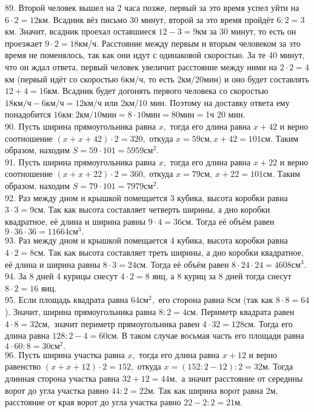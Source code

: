 89. Второй человек вышел на 2 часа позже, первый за это время успел уйти на $6\cdot2=12$км. Всадник вёз письмо 30 минут, второй за это время пройдёт $6:2=3$км. Значит, всадник проехал оставшиеся $12-3=9$км за 30 минут, то есть он проезжает $9\cdot2=18$км/ч. Расстояние между первым и вторым человеком за это время не поменялось, так как они идут с одинаковой скоростью. За те 40 минут, что он ждал ответа, первый человек увеличит расстояние между ними на $2\cdot2=4$км (первый идёт со скоростью 6км/ч, то есть 2км/20мин) и оно будет составлять $12+4=16$км. Всадник будет догонять первого человека со скоростью $18\text{км/ч}-6\text{км/ч}=12\text{км/ч}$ или 2км/10 мин. Поэтому на доставку ответа ему понадобится $16\text{км}:2\text{км/10мин}=8\cdot10\text{мин}=80\text{мин}=$1ч 20 мин.\\
90. Пусть ширина прямоугольника равна $x,$ тогда его длина равна $x+42$ и верно соотношение $(x+x+42)\cdot2=320,$ откуда $x=59\text{см}, x+42=101\text{см}.$ Таким образом, находим
$S=59\cdot101=5959\text{см}^2.$\\
91. Пусть ширина прямоугольника равна $x,$ тогда его длина равна $x+22$ и верно соотношение $(x+x+22)\cdot2=360,$ откуда $x=79\text{см},\ x+22=101\text{см}.$ Таким образом, находим
$S=79\cdot101=7979\text{см}^2.$\\
92. Раз между дном и крышкой помещается 3 кубика, высота коробки равна $3\cdot3=9$см. Так как высота составляет четверть ширины, а дно коробки квадратное, её длина и ширина равны $9\cdot4=36$см. Тогда её объём равен $9\cdot36\cdot36=11664\text{см}^3.$\\
93. Раз между дном и крышкой помещается 4 кубика, высота коробки равна $4\cdot2=8$см. Так как высота составляет треть ширины, а дно коробки квадратное, её длина и ширина равны $8\cdot3=24$см. Тогда её объём равен $8\cdot24\cdot24=4608\text{см}^3.$\\
94. За 8 дней 4 курицы снесут $4\cdot2=8$ яиц, а 8 куриц за 8 дней тогда снесут $8\cdot2=16$ яиц.\\
95. Если площадь квадрата равна $64\text{см}^2,$ его сторона равна $8\text{см}$ (так как $8\cdot8=64$). Значит, ширина прямоугольника равна $8:2=4\text{см}.$ Периметр квадрата равен $4\cdot8=32\text{см},$ значит периметр прямоугольника равен $4\cdot32=128$см. Тогда его длина равна $128:2-4=60$см. В таком случае восьмая
часть его площади равна $4\cdot60:8=30\text{см}^2.$\\
96. Пусть ширина участка равна $x,$ тогда его длина равна $x+12$ и верно равенство $(x+x+12)\cdot2=152,$ откуда $x=(152:2-12):2=32\text{м}.$ Тогда длинная сторона участка равна $32+12=44\text{м},$ а значит расстояние от середины ворот до угла участка равно $44:2=22\text{м}.$ Так как ширина ворот равна 2м, расстояние от края ворот до угла участка равно $22-2:2=21\text{м}.$\\
